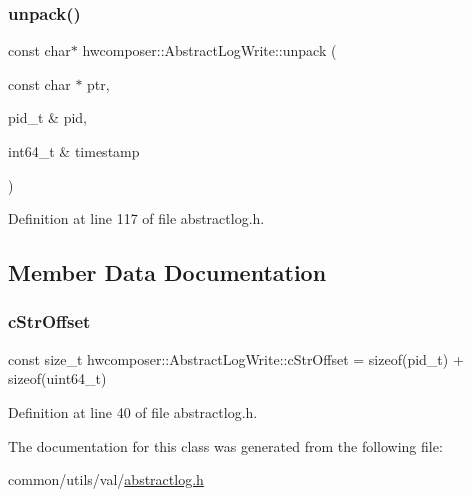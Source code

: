 \subsubsection{\texorpdfstring{unpack()}{unpack()}}
{\footnotesize\ttfamily const char$\ast$ hwcomposer\+::\+Abstract\+Log\+Write\+::unpack (\begin{DoxyParamCaption}\item[{const char $\ast$}]{ptr,  }\item[{pid\+\_\+t \&}]{pid,  }\item[{int64\+\_\+t \&}]{timestamp }\end{DoxyParamCaption})\hspace{0.3cm}{\ttfamily [inline]}}



Definition at line 117 of file abstractlog.\+h.


\begin{DoxyCode}{0}
\end{DoxyCode}


\subsection{Member Data Documentation}
\mbox{\label{classhwcomposer_1_1AbstractLogWrite_a926b1236104dd30fd5262cfd7f66fa79}} 
\subsubsection{\texorpdfstring{c\+Str\+Offset}{cStrOffset}}
{\footnotesize\ttfamily const size\+\_\+t hwcomposer\+::\+Abstract\+Log\+Write\+::c\+Str\+Offset = sizeof(pid\+\_\+t) + sizeof(uint64\+\_\+t)\hspace{0.3cm}{\ttfamily [static]}}



Definition at line 40 of file abstractlog.\+h.



The documentation for this class was generated from the following file\+:\begin{DoxyCompactItemize}
\item 
common/utils/val/\mbox{\hyperlink{abstractlog_8h}{abstractlog.\+h}}\end{DoxyCompactItemize}
